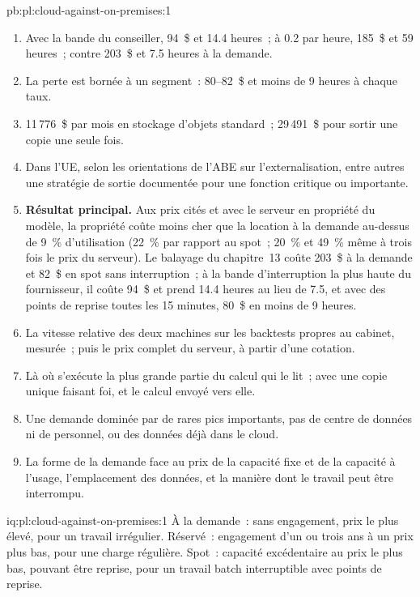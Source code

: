 \begin{solution}{pb:pl:cloud-against-on-premises:1}
\begin{enumerate}
\item Avec la bande du conseiller, 94~\$ et 14.4 heures~; à 0.2 par heure, 185~\$ et 59 heures~; contre 203~\$ et 7.5 heures à la demande.
\item La perte est bornée à un segment~: 80--82~\$ et moins de 9 heures à chaque taux.
\item 11\,776~\$ par mois en stockage d'objets standard~; 29\,491~\$ pour sortir une copie une seule fois.
\item Dans l'UE, selon les orientations de l'ABE sur l'externalisation, entre autres une stratégie de sortie documentée pour une fonction critique ou importante.
\item \textbf{Résultat principal.} Aux prix cités et avec le serveur en propriété du modèle, la propriété coûte moins cher que la location à la demande au-dessus de 9~\% d'utilisation
(22~\% par rapport au spot~; 20~\% et 49~\% même à trois fois le prix du serveur). Le balayage du chapitre~13 coûte 203~\$ à la demande et 82~\$ en spot sans
interruption~; à la bande d'interruption la plus haute du fournisseur, il coûte 94~\$ et prend 14.4 heures au lieu de 7.5, et avec des points de reprise toutes les 15 minutes,
80~\$ en moins de 9 heures.
\item La vitesse relative des deux machines sur les backtests propres au cabinet, mesurée~; puis le prix complet du serveur, à partir d'une cotation.
\item Là où s'exécute la plus grande partie du calcul qui le lit~; avec une copie unique faisant foi, et le calcul envoyé vers elle.
\item Une demande dominée par de rares pics importants, pas de centre de données ni de personnel, ou des données déjà dans le cloud.
\item La forme de la demande face au prix de la capacité fixe et de la capacité à l'usage, l'emplacement des données, et la manière dont le travail peut être interrompu.
\end{enumerate}
\end{solution}

\begin{solution}{iq:pl:cloud-against-on-premises:1}
À la demande~: sans engagement, prix le plus élevé, pour un travail irrégulier. Réservé~: engagement d'un ou trois ans à un prix plus bas, pour une charge régulière. Spot~:
capacité excédentaire au prix le plus bas, pouvant être reprise, pour un travail batch interruptible avec points de reprise.
\end{solution}

